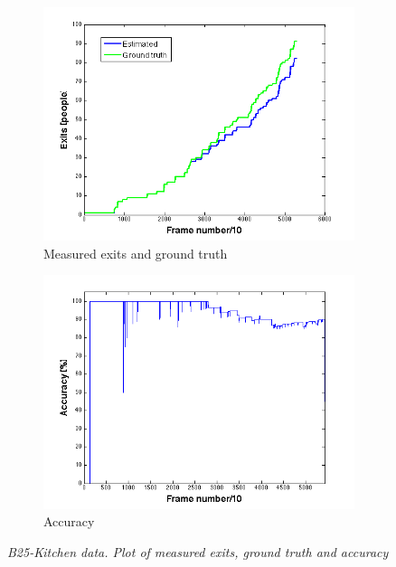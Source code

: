 \begin{figure}[h]
\centering
\begin{subfigure}{.5\textwidth}
  \centering
  \includegraphics[width=1.1\linewidth]{images/exitsGTB25.png}
  \caption{Measured exits and ground truth}
  \label{fig:sub1}
\end{subfigure}%
\begin{subfigure}{.5\textwidth}
  \centering
  \includegraphics[width=1.1\linewidth]{images/accOutB25.png}
  \caption{Accuracy}
  \label{fig:sub2}
\end{subfigure}
\caption[B25-kitchen exits]{\textit{B25-Kitchen data. Plot of measured exits, ground truth and accuracy}}
\label{fig:B25-kitchen exits}
\end{figure}
\newpage

